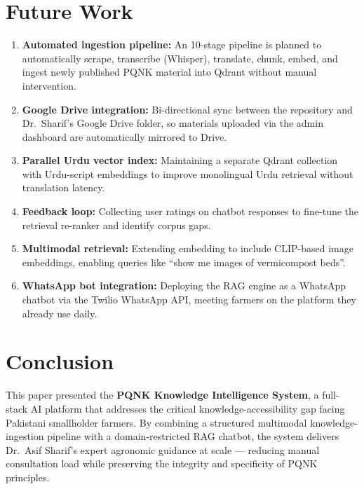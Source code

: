 \documentclass[12pt, a4paper]{article}
\begin{document}
\begin{onehalfspacing}
\section{Future Work}

\begin{enumerate}
  \item \textbf{Automated ingestion pipeline:} An 10-stage pipeline is planned
    to automatically scrape, transcribe (Whisper), translate, chunk, embed, and
    ingest newly published PQNK material into Qdrant without manual intervention.
  \item \textbf{Google Drive integration:} Bi-directional sync between the
    repository and Dr.~Sharif's Google Drive folder, so materials uploaded via
    the admin dashboard are automatically mirrored to Drive.
  \item \textbf{Parallel Urdu vector index:} Maintaining a separate Qdrant
    collection with Urdu-script embeddings to improve monolingual Urdu retrieval
    without translation latency.
  \item \textbf{Feedback loop:} Collecting user ratings on chatbot responses
    to fine-tune the retrieval re-ranker and identify corpus gaps.
  \item \textbf{Multimodal retrieval:} Extending embedding to include CLIP-based
    image embeddings, enabling queries like ``show me images of vermicompost beds''.
  \item \textbf{WhatsApp bot integration:} Deploying the RAG engine as a
    WhatsApp chatbot via the Twilio WhatsApp API, meeting farmers on the platform
    they already use daily.
\end{enumerate}


\section{Conclusion}

This paper presented the \textbf{PQNK Knowledge Intelligence System}, a
full-stack AI platform that addresses the critical knowledge-accessibility gap
facing Pakistani smallholder farmers. By combining a structured multimodal
knowledge-ingestion pipeline with a domain-restricted RAG chatbot,
the system delivers Dr.~Asif Sharif's expert agronomic guidance at scale ---
reducing manual consultation load while preserving the integrity and specificity
of PQNK principles.


\end{onehalfspacing}
\end{document}
